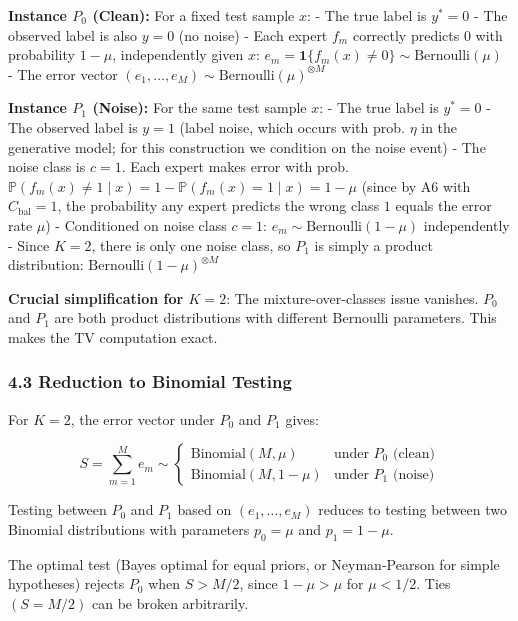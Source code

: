 \documentclass[
  12pt,
]{article}
\begin{document}
\textbf{Instance \(P_0\) (Clean):} For a fixed test sample \(x\): - The
true label is \(y^* = 0\) - The observed label is also \(y = 0\) (no
noise) - Each expert \(f_m\) correctly predicts \(0\) with probability
\(1-\mu\), independently given \(x\):
\(e_m = \mathbf{1}\{f_m(x) \neq 0\} \sim \text{Bernoulli}(\mu)\) - The
error vector \((e_1,\dots,e_M) \sim \text{Bernoulli}(\mu)^{\otimes M}\)

\textbf{Instance \(P_1\) (Noise):} For the same test sample \(x\): - The
true label is \(y^* = 0\) - The observed label is \(y = 1\) (label
noise, which occurs with prob. \(\eta\) in the generative model; for
this construction we condition on the noise event) - The noise class is
\(c = 1\). Each expert makes error with prob.
\(\mathbb{P}(f_m(x) \neq 1 \mid x) = 1 - \mathbb{P}(f_m(x) = 1 \mid x) = 1 - \mu\)
(since by A6 with \(C_{\text{bal}}=1\), the probability any expert
predicts the wrong class \(1\) equals the error rate \(\mu\)) -
Conditioned on noise class \(c=1\): \(e_m \sim \text{Bernoulli}(1-\mu)\)
independently - Since \(K=2\), there is only one noise class, so \(P_1\)
is simply a product distribution:
\(\text{Bernoulli}(1-\mu)^{\otimes M}\)

\textbf{Crucial simplification for \(K=2\)}: The mixture-over-classes
issue vanishes. \(P_0\) and \(P_1\) are both product distributions with
different Bernoulli parameters. This makes the TV computation exact.

\subsubsection{4.3 Reduction to Binomial
Testing}\label{reduction-to-binomial-testing}

For \(K=2\), the error vector under \(P_0\) and \(P_1\) gives:

\[S = \sum_{m=1}^M e_m \sim \begin{cases}
\text{Binomial}(M, \mu) & \text{under } P_0 \text{ (clean)} \\
\text{Binomial}(M, 1-\mu) & \text{under } P_1 \text{ (noise)}
\end{cases}\]

Testing between \(P_0\) and \(P_1\) based on \((e_1,\dots,e_M)\) reduces
to testing between two Binomial distributions with parameters
\(p_0 = \mu\) and \(p_1 = 1-\mu\).

The optimal test (Bayes optimal for equal priors, or Neyman-Pearson for
simple hypotheses) rejects \(P_0\) when \(S > M/2\), since
\(1-\mu > \mu\) for \(\mu < 1/2\). Ties \((S = M/2)\) can be broken
arbitrarily.
\end{document}
